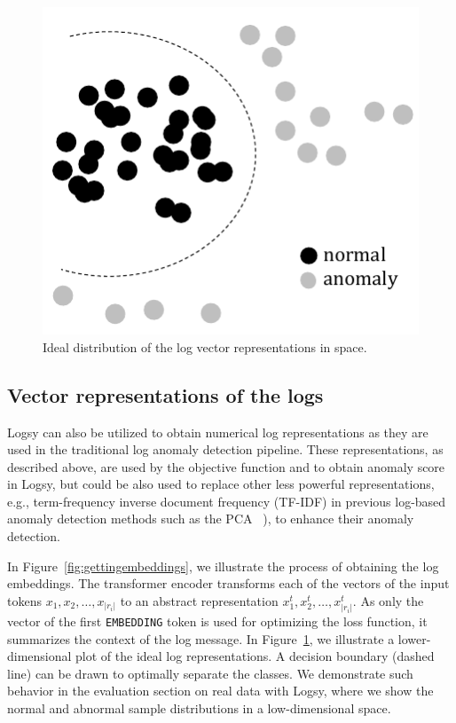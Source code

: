 \begin{figure}[!t]
    \centering
    \includegraphics[width=0.6\columnwidth]{gfx/chap4/embeddingsinspace.pdf}
    \caption{Ideal distribution of the log vector representations in space.}
    \label{fig:lowdimensions}
\end{figure}


\subsection{Vector representations of the logs}\label{vectorrepresentations}
Logsy can also be utilized to obtain numerical log representations as they are used in the traditional log anomaly detection pipeline. These representations, as described above, are used by the objective function and to obtain anomaly score in Logsy, but could be also used to replace other less powerful representations, e.g., term-frequency inverse document frequency (TF-IDF) in previous log-based anomaly detection methods such as the PCA ~\cite{xu2009detecting}), to enhance their anomaly detection. 

In Figure~\ref{fig:gettingembeddings}, we illustrate the process of obtaining the log embeddings. The transformer encoder transforms each of the vectors of the input tokens $x_1, x_2, \dots, x_{|r_i|}$ to an abstract representation $x_1^t, x_2^t, \dots, x_{|r_i|}^t$. As only the vector of the first \texttt{EMBEDDING} token is used for optimizing the loss function, it summarizes the context of the log message. In Figure~\ref{fig:lowdimensions}, we illustrate a lower-dimensional plot of the ideal log representations. A decision boundary (dashed line) can be drawn to optimally separate the classes. We demonstrate such behavior in the evaluation section on real data with Logsy, where we show the normal and abnormal sample distributions in a low-dimensional space.

